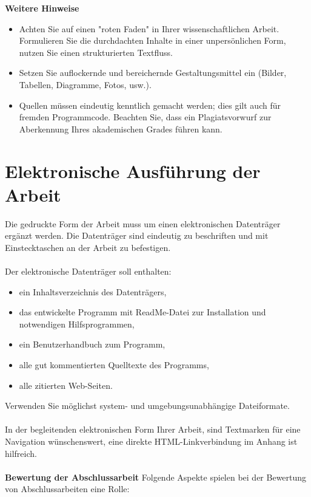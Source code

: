 \textbf{Weitere Hinweise}

\begin{itemize}
\item Achten Sie auf einen "roten Faden" in Ihrer wissenschaftlichen Arbeit. Formulieren Sie die durchdachten Inhalte in einer unpersönlichen Form, nutzen Sie einen strukturierten Textfluss.
\item Setzen Sie auflockernde und bereichernde Gestaltungsmittel ein (Bilder, Tabellen, Diagramme, Fotos, usw.).
\item Quellen müssen  eindeutig kenntlich gemacht werden; dies gilt auch für fremden Programmcode. Beachten Sie, dass ein Plagiatsvorwurf zur Aberkennung Ihres akademischen Grades führen kann.
\end{itemize}

\section{Elektronische Ausführung der Arbeit}

Die gedruckte Form der Arbeit muss um einen elektronischen Datenträger ergänzt werden. Die Datenträger sind eindeutig zu beschriften und mit Einstecktaschen an der Arbeit zu befestigen. \\  \\
Der elektronische Datenträger soll enthalten:

\begin{itemize}
\item ein Inhaltsverzeichnis des Datenträgers,
\item das entwickelte Programm mit ReadMe-Datei zur Installation und notwendigen Hilfsprogrammen,
\item ein Benutzerhandbuch zum Programm,
\item alle gut kommentierten Quelltexte des Programms,
\item alle zitierten Web-Seiten.
\end{itemize}

Verwenden Sie möglichst system- und umgebungsunabhängige Dateiformate. \\ \\
In der begleitenden elektronischen Form Ihrer Arbeit, sind Textmarken für eine Navigation wünschenswert, eine direkte HTML-Linkverbindung im Anhang ist hilfreich.
\\ \\
\textbf{Bewertung der Abschlussarbeit}
Folgende Aspekte spielen bei der Bewertung von Abschlussarbeiten eine Rolle:

